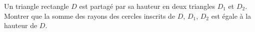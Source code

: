 Un triangle rectangle $D$ est partagé par sa hauteur en deux triangles $D_1$ et $D_2$. Montrer que la somme des rayons des cercles inscrits de $D$, $D_1$, $D_2$ est égale à la hauteur de $D$.
